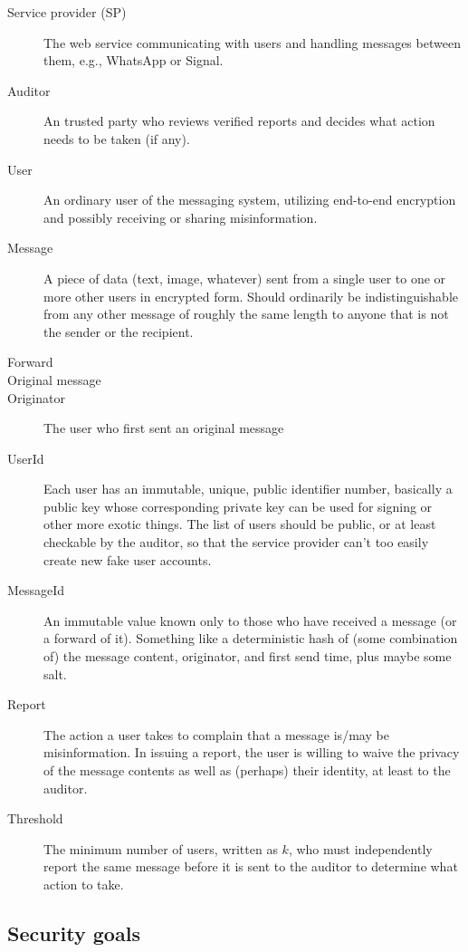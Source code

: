 \documentclass[letterpaper,12pt]{article}
\begin{document}
\begin{description}
  \item[Service provider (SP)] The web service communicating with users and
    handling messages between them, e.g., WhatsApp or Signal.
  \item[Auditor] An trusted party who reviews verified reports and
    decides what action needs to be taken (if any).
  \item[User] An ordinary user of the messaging system, utilizing end-to-end
    encryption and possibly receiving or sharing misinformation.
  \item[Message] A piece of data (text, image, whatever) sent from a
    single user to one or more other users in encrypted form.
    Should ordinarily be indistinguishable
    from any other message of roughly the same length to anyone that is
    not the sender or the recipient.
  \item[Forward]
  \item[Original message]
  \item[Originator] The user who first sent an original message
  \item[UserId] Each user has an immutable, unique, public identifier
    number, basically a public key whose corresponding private key can
    be used for signing or other more exotic things. The list of users
    should be public, or at least checkable by the auditor, so that the
    service provider can't too easily create new fake user accounts.
  \item[MessageId] An immutable value known only to those who have
    received a message (or a forward of it).
    Something like a deterministic hash of (some combination of) the
    message content, originator, and first send time, plus maybe some
    salt.
  \item[Report] The action a user takes to complain that a message
    is/may be misinformation. In issuing a report, the user is willing
    to waive the privacy of the message contents as well as (perhaps)
    their identity, at least to the auditor.
  \item[Threshold] The minimum number of users, written as $k$, who must
    independently report the same message before it is sent to the
    auditor to determine what action to take.
\end{description}

\subsection{Security goals}
\end{document}
